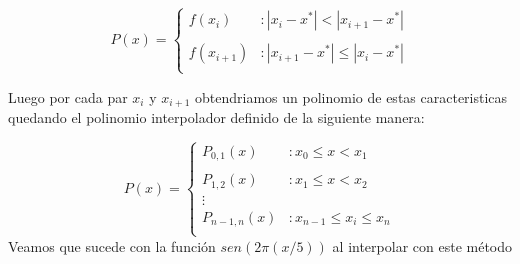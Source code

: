 \vspace{4mm}
\begin{displaymath}
   P(x) = \left\{
     \begin{array}{lr}
       f(x_i)  & : |x_i - x^*| < |x_{i+1} - x^*|\\\\
       f(x_{i+1})  & : |x_{i+1} - x^*| \leq |x_i - x^*|\\
     \end{array}
   \right.
\end{displaymath} 

Luego por cada par $x_i$ y $x_{i+1}$ obtendriamos un polinomio de estas caracteristicas quedando el polinomio interpolador definido de la siguiente manera:

\vspace{4mm}
\begin{displaymath}
   P(x) = \left\{
     \begin{array}{lr}
       P_{0,1}(x)  & : x_0 \leq x < x_1\\\\
       P_{1,2}(x)  & : x_1 \leq x < x_2\\
       \vdots\\
       P_{n-1,n}(x) & : x_{n-1} \leq x_i \leq x_n\\
     \end{array}
   \right.
\end{displaymath} 
\vspace{4mm}
Veamos que sucede con la función $sen(2\pi(x/5))$ al interpolar con este método


